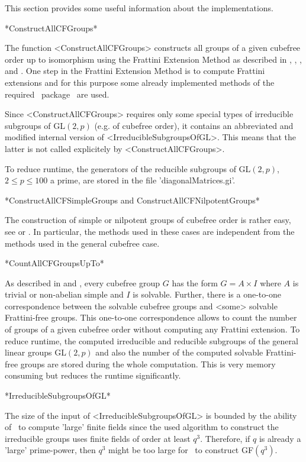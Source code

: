 This section provides some useful information about the implementations.


*ConstructAllCFGroups*

The function <ConstructAllCFGroups> constructs all groups of a given
cubefree order up to isomorphism using the Frattini Extension Method as described in \cite{Di05},
  \cite{DiEi05}, \cite{BeEia}, and \cite{BeEib}. One step in the Frattini
  Extension Method is to compute Frattini extensions 
  and for this purpose some already implemented
methods of the required \GAP ~package \GrpConst ~are used. 

Since <ConstructAllCFGroups> requires only
some special types of irreducible subgroups of GL$(2,p)$ (e.g. of cubefree order), it
contains an abbreviated and modified internal version of
<IrreducibleSubgroupsOfGL>. This means that the latter is not called explicitely by
<ConstructAllCFGroups>.

To reduce runtime, the generators of the reducible subgroups of GL$(2,p)$,
$2\leq p \leq 100$ a prime, are stored in the file 'diagonalMatrices.gi'.



*ConstructAllCFSimpleGroups and ConstructAllCFNilpotentGroups*

The construction of simple or nilpotent groups of cubefree
order is rather easy, see \cite{Di05} or \cite{DiEi05}. In particular, the
methods used in these cases are independent from the methods used in the general cubefree case.



*CountAllCFGroupsUpTo*

As described in \cite{Di05} and \cite{DiEi05}, every cubefree group $G$ has
the form $G=A\times I$ where $A$ is trivial or non-abelian simple and $I$ is
solvable. Further, there is a one-to-one correspondence between the solvable
cubefree groups and <some> solvable Frattini-free groups. This one-to-one
correspondence allows to count the number of groups of a given cubefree order without
computing any Frattini extension.
To reduce runtime, the
computed irreducible and reducible subgroups of the general linear groups
GL$(2,p)$ and also the number of the computed solvable
Frattini-free groups are stored during the whole computation. This is very
memory consuming but reduces the runtime significantly.

*IrreducibleSubgroupsOfGL*

The size of the input of <IrreducibleSubgroupsOfGL> is bounded by the
ability of \GAP ~to compute 'large' finite fields since the used algorithm to
construct the irreducible groups uses finite fields of
order at least $q^3$. Therefore, if $q$ is already a 'large' prime-power, then
$q^3$ might be too large for \GAP ~to construct GF$(q^3)$. 



